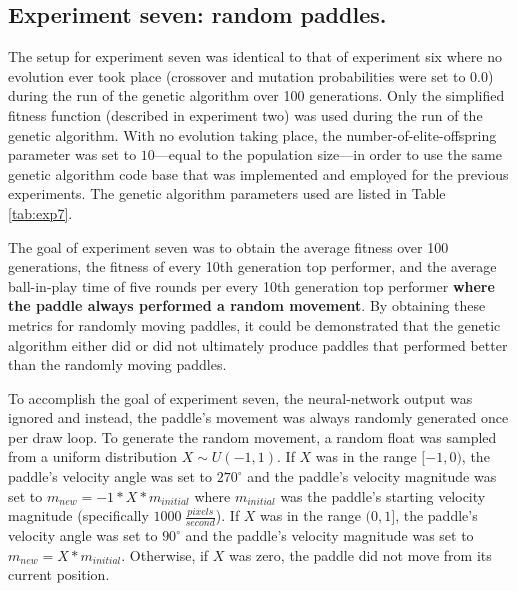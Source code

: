 \documentclass[a4paper,10pt]{article}
\begin{document}
\subsection{Experiment seven: random paddles.} 


The setup for experiment seven was identical to that of experiment six where no evolution ever took place (crossover and mutation probabilities were set to $0.0$) during the run of the genetic algorithm over 100 generations. Only the simplified fitness function (described in experiment two) was used during the run of the genetic algorithm. With no evolution taking place, the number-of-elite-offspring parameter was set to $10$---equal to the population size---in order to use the same genetic algorithm code base that was implemented and employed for the previous experiments. The genetic algorithm parameters used are listed in Table \ref{tab:exp7}. 

The goal of experiment seven was to obtain the average fitness over 100 generations, the fitness of every 10th generation top performer, and the average ball-in-play time of five rounds per every 10th generation top performer \textbf{where the paddle always performed a random movement}. By obtaining these metrics for randomly moving paddles, it could be demonstrated that the genetic algorithm either did or did not ultimately produce paddles that performed better than the randomly moving paddles. 

To accomplish the goal of experiment seven, the neural-network output was ignored and instead, the paddle's movement was always randomly generated once per draw loop. To generate the random movement, a random float was sampled from a uniform distribution $X\sim U(-1,1)$. If $X$ was in the range $[-1,0)$, the paddle's velocity angle was set to $270^\circ$ and the paddle's velocity magnitude was set to $m_{new} = -1 * X * m_{initial}$ where $m_{initial}$ was the paddle's starting velocity magnitude (specifically $1000 \ \frac{pixels}{second}$). If $X$ was in the range $(0,1]$, the paddle's velocity angle was set to $90^\circ$ and the paddle's velocity magnitude was set to $m_{new} = X * m_{initial}$. Otherwise, if $X$ was zero, the paddle did not move from its current position. 
\end{document}
